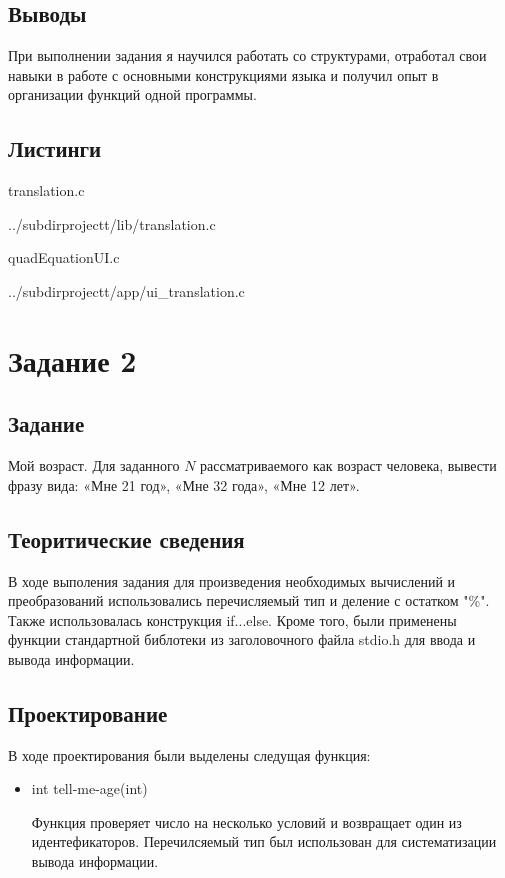 \documentclass[12pt,a4paper]{report}
\begin{document}
\subsection{Выводы}

При выполнении задания я научился работать со структурами, отработал свои навыки в работе с основными конструкциями языка и получил опыт в организации функций одной программы.

\subsection*{Листинги}

translation.c

{../subdirprojectt/lib/translation.c}

\vspace{\baselineskip}

quadEquationUI.c

{../subdirprojectt/app/ui_translation.c}


\section{Задание 2}
\subsection{Задание}

Мой возраст. Для заданного $N$ рассматриваемого как возраст человека, вывести фразу вида: «Мне 21 год», «Мне 32 года», «Мне 12 лет». 

\subsection{Теоритические сведения}

В ходе выполения задания для произведения необходимых вычислений и преобразований использовались перечисляемый тип и деление с остатком "\%". Также использовалась конструкция if...else. Кроме того, были применены функции стандартной библотеки из заголовочного файла stdio.h для ввода и вывода информации.

\subsection{Проектирование}


В ходе проектирования были выделены следущая функция:

\begin{itemize}

\item int tell-me-age(int)

	Функция проверяет число на несколько условий и возвращает один из идентефикаторов. Перечилсяемый тип был использован для систематизации вывода информации.
	
\end{itemize}
\end{document}
